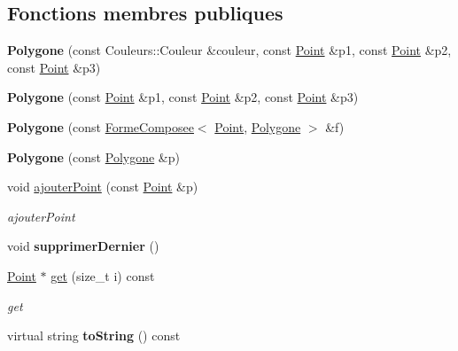 \subsection*{Fonctions membres publiques}
\begin{DoxyCompactItemize}
\item 
\hypertarget{class_polygone_a2b5e7a67425d3c6e6f0b4d0c998928ae}{{\bfseries Polygone} (const Couleurs\+::\+Couleur \&couleur, const \hyperlink{class_point}{Point} \&p1, const \hyperlink{class_point}{Point} \&p2, const \hyperlink{class_point}{Point} \&p3)}\label{class_polygone_a2b5e7a67425d3c6e6f0b4d0c998928ae}

\item 
\hypertarget{class_polygone_ad5dd11ef57a4955446e3d47c90c9a801}{{\bfseries Polygone} (const \hyperlink{class_point}{Point} \&p1, const \hyperlink{class_point}{Point} \&p2, const \hyperlink{class_point}{Point} \&p3)}\label{class_polygone_ad5dd11ef57a4955446e3d47c90c9a801}

\item 
\hypertarget{class_polygone_a1aef610ad14c85f49e2557d4104cfbc0}{{\bfseries Polygone} (const \hyperlink{class_forme_composee}{Forme\+Composee}$<$ \hyperlink{class_point}{Point}, \hyperlink{class_polygone}{Polygone} $>$ \&f)}\label{class_polygone_a1aef610ad14c85f49e2557d4104cfbc0}

\item 
\hypertarget{class_polygone_a668cda1260040ee9d9a273e619e89c77}{{\bfseries Polygone} (const \hyperlink{class_polygone}{Polygone} \&p)}\label{class_polygone_a668cda1260040ee9d9a273e619e89c77}

\item 
void \hyperlink{class_polygone_a866ae8e0988baecdd582b22924986c9e}{ajouter\+Point} (const \hyperlink{class_point}{Point} \&p)
\begin{DoxyCompactList}\small\item\em ajouter\+Point \end{DoxyCompactList}\item 
\hypertarget{class_polygone_afc3b49ce264ac9351decd6a949ee4195}{void {\bfseries supprimer\+Dernier} ()}\label{class_polygone_afc3b49ce264ac9351decd6a949ee4195}

\item 
\hyperlink{class_point}{Point} $\ast$ \hyperlink{class_polygone_a7a10a1addd6e669b9657f72d6a3ac014}{get} (size\+\_\+t i) const 
\begin{DoxyCompactList}\small\item\em get \end{DoxyCompactList}\item 
\hypertarget{class_polygone_ab12c615571471004936009f198a8ce2e}{virtual string {\bfseries to\+String} () const }\label{class_polygone_ab12c615571471004936009f198a8ce2e}


\end{DoxyCompactItemize}
